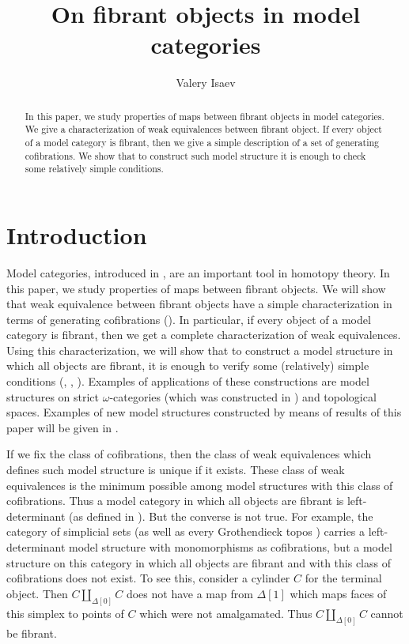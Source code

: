 \documentclass{tac}
\author{Valery Isaev}
\title{On fibrant objects in model categories}
\theoremstyle{definition}
\begin{document}
\maketitle

\begin{abstract}
In this paper, we study properties of maps between fibrant objects in model categories.
We give a characterization of weak equivalences between fibrant object.
If every object of a model category is fibrant, then we give a simple description of a set of generating cofibrations.
We show that to construct such model structure it is enough to check some relatively simple conditions.
\end{abstract}

\section{Introduction}

Model categories, introduced in \cite{quillen}, are an important tool in homotopy theory.
In this paper, we study properties of maps between fibrant objects.
We will show that weak equivalence between fibrant objects have a simple characterization in terms of generating cofibrations ().
In particular, if every object of a model category is fibrant, then we get a complete characterization of weak equivalences.
Using this characterization, we will show that to construct a model structure in which all objects are fibrant,
it is enough to verify some (relatively) simple conditions (, , ).
Examples of applications of these constructions are model structures on strict $\omega$-categories (which was constructed in \cite{folk}) and topological spaces.
Examples of new model structures constructed by means of results of this paper will be given in \cite{alg-models}.

If we fix the class of cofibrations, then the class of weak equivalences which defines such model structure is unique if it exists.
These class of weak equivalences is the minimum possible among model structures with this class of cofibrations.
Thus a model category in which all objects are fibrant is left-determinant (as defined in \cite{left-det}).
But the converse is not true.
For example, the category of simplicial sets (as well as every Grothendieck topos \cite{cisinski})
carries a left-determinant model structure with monomorphisms as cofibrations,
but a model structure on this category in which all objects are fibrant and with this class of cofibrations does not exist.
To see this, consider a cylinder $C$ for the terminal object.
Then $C \amalg_{\Delta[0]} C$ does not have a map from $\Delta[1]$ which
maps faces of this simplex to points of $C$ which were not amalgamated.
Thus $C \amalg_{\Delta[0]} C$ cannot be fibrant.
\end{document}
